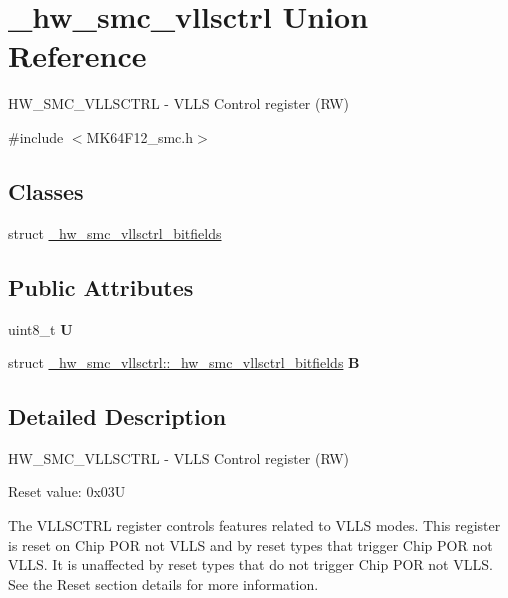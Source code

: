 \hypertarget{union__hw__smc__vllsctrl}{}\section{\+\_\+hw\+\_\+smc\+\_\+vllsctrl Union Reference}
\label{union__hw__smc__vllsctrl}


H\+W\+\_\+\+S\+M\+C\+\_\+\+V\+L\+L\+S\+C\+T\+RL -\/ V\+L\+LS Control register (RW)  




{\ttfamily \#include $<$M\+K64\+F12\+\_\+smc.\+h$>$}

\subsection*{Classes}
\begin{DoxyCompactItemize}
\item 
struct \hyperlink{struct__hw__smc__vllsctrl_1_1__hw__smc__vllsctrl__bitfields}{\+\_\+hw\+\_\+smc\+\_\+vllsctrl\+\_\+bitfields}
\end{DoxyCompactItemize}
\subsection*{Public Attributes}
\begin{DoxyCompactItemize}
\item 
uint8\+\_\+t {\bfseries U}\hypertarget{union__hw__smc__vllsctrl_a6ba9c099c5f62d37fb85d777122a0102}{}\label{union__hw__smc__vllsctrl_a6ba9c099c5f62d37fb85d777122a0102}

\item 
struct \hyperlink{struct__hw__smc__vllsctrl_1_1__hw__smc__vllsctrl__bitfields}{\+\_\+hw\+\_\+smc\+\_\+vllsctrl\+::\+\_\+hw\+\_\+smc\+\_\+vllsctrl\+\_\+bitfields} {\bfseries B}\hypertarget{union__hw__smc__vllsctrl_a5b3710308e2712fa8c9d7767cc813dec}{}\label{union__hw__smc__vllsctrl_a5b3710308e2712fa8c9d7767cc813dec}

\end{DoxyCompactItemize}


\subsection{Detailed Description}
H\+W\+\_\+\+S\+M\+C\+\_\+\+V\+L\+L\+S\+C\+T\+RL -\/ V\+L\+LS Control register (RW) 

Reset value\+: 0x03U

The V\+L\+L\+S\+C\+T\+RL register controls features related to V\+L\+LS modes. This register is reset on Chip P\+OR not V\+L\+LS and by reset types that trigger Chip P\+OR not V\+L\+LS. It is unaffected by reset types that do not trigger Chip P\+OR not V\+L\+LS. See the Reset section details for more information. 

